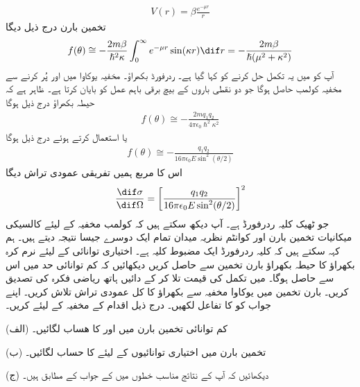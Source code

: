 \begin{align}
	V(r) = \beta\frac{e^{-\mu r}}{r}
\end{align}
تخمین بارن درج ذیل دیگا 
\begin{align}
	f(\theta)\cong-\frac{2m\beta}{\hslash^2\kappa}\int_{0}^{\infty}e^{-\mu r}\sin(\kappa r)\dif r=-\frac{2m\beta}{\hslash(\mu^2+\kappa^2)}
\end{align}
آپ کو  میں یہ تکمل حل کرنے کو کہا گیا ہے۔
ردرفورڈ بکھراؤ۔ مخفیہ یوکاوا میں  اور  پُر کرنے سے مخفیہ کولمب حاصل ہوگا جو دو نقطی باروں کے بیچ برقی باہم عمل کو بایان کرتا ہے۔ ظاہر ہے کہ حیطہ بکھراؤ درج ذیل ہوگا 
\begin{align}
	f(\theta)\cong-\frac{2mq_1q_2}{4\pi\epsilon_0\hslash^2\kappa^2}
\end{align}
یا  استعمال کرتے ہوئے درج ذیل ہوگا 
\begin{align}
	f(\theta)\cong-\frac{q_1q_2}{16\pi\epsilon_0E\sin^2(\theta/2)}
\end{align}
اس کا مربع ہمیں تفریقی عمودی تراش دیگا 
\begin{align}
	\frac{\dif\sigma}{\dif\Omega}=\left[\frac{q_1q_2}{16\pi\epsilon_0E\sin^2(\theta/2)}\right]^2
\end{align}
جو ٹھیک کلیہ ردرفورڈ  ہے۔ آپ دیکھ سکتے ہیں کہ کولمب مخفیہ کے لیئے کالسیکی میکانیات تخمین بارن اور کوانٹم نظریہ میدان تمام ایک دوسرے جیسا نتیجہ دیتے ہیں۔ ہم کہہ سکتے ہیں کہ کلیہ ردرفورڈ ایک مضبوط کلیہ ہے۔
اختیاری توانائی کے لیئے نرم کرہ بکھراؤ کا حیطہ بکھراؤ بارن تخمین سے حاصل کریں دیکھائیں کہ کم توانائی حد میں اس سے  حاصل ہوگا۔
 میں تکمل کی قیمت تلا کر کے دائیں ہاتھ ریاضی فکرہ کی تصدیق کریں۔
بارن تخمین میں یوکاوا مخفیہ سے بکھراؤ کا کل عمودی تراش تلاش کریں۔ اپنے جواب کو  کا تفاعل لکھیں۔
درج ذیل اقدام  کے مخفیہ کے لیئے کریں۔

(الف) کم توانائی تخمین بارن میں  اور  کا ھساب لگائیں۔

(ب) تخمین بارن میں اختیاری توانائیوں کے لیئے  کا حساب لگائیں۔

(ج) دیکھائیں کہ آپ کے نتائج مناسب خطوں میں  کے جواب کے مطابق ہیں۔

